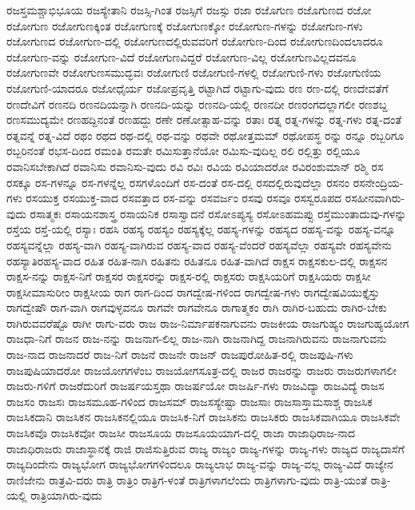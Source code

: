 {ರಜಸ್ತಮಶ್ಚಾಭಿಭೂಯ
ರಜಸ್ಯೇತಾನಿ
ರಜಸ್ಸಿ-ಗಿಂತ
ರಜಸ್ಸಿಗೆ
ರಜಸ್ಸು
ರಜಾ
ರಜೊಗುಣ
ರಜೊಗುಣದ
ರಜೋ
ರಜೋಗುಣ
ರಜೋಗುಣಕ್ಕಿಂತ
ರಜೋಗುಣಕ್ಕೆ
ರಜೋಗುಣಕ್ಕೋ
ರಜೋಗುಣ-ಗಳನ್ನು
ರಜೋಗುಣ-ಗಳು
ರಜೋಗುಣದ
ರಜೋಗುಣ-ದಲ್ಲಿ
ರಜೋಗುಣದಲ್ಲಿರುವವರಿಗೆ
ರಜೋಗುಣ-ದಿಂದ
ರಜೋಗುಣದಿಂದಲಾದರೂ
ರಜೋಗುಣ-ವನ್ನು
ರಜೋಗುಣ-ವಿದೆ
ರಜೋಗುಣವಿದ್ದರೆ
ರಜೋಗುಣ-ವಿಲ್ಲ
ರಜೋಗುಣವಿಲ್ಲದವನೂ
ರಜೋಗುಣವೇ
ರಜೋಗುಣಸಮುದ್ಭವಃ
ರಜೋಗುಣಿ
ರಜೋಗುಣಿ-ಗಳಲ್ಲಿ
ರಜೋಗುಣಿ-ಗಳು
ರಜೋಗುಣಿಯ
ರಜೋಗುಣಿ-ಯಾದರೂ
ರಜೋಧೈರ್ಯ
ರಜೋಪ್ರವೃತ್ತಿ
ರಟ್ಟಾಗಿದೆ
ರಟ್ಟಾಗು-ವುದು
ರಣ
ರಣ-ದಲ್ಲಿ
ರಣದೇವತೆಗೆ
ರಣದೇವಿಗೆ
ರಣನದಿ
ರಣನದಿಯನ್ನಾಗಿ
ರಣನದಿ-ಯನ್ನು
ರಣನದಿ-ಯಲ್ಲಿ
ರಣನದೀ
ರಣರಂಗದಲ್ಲಾಗಲೀ
ರಣಶಬ್ದ
ರಣಸಮುದ್ಯಮೇ
ರಣಹದ್ದಿನಂತೆ
ರಣಹದ್ದು
ರಣೇ
ರಣೋತ್ಸಾಹ-ವನ್ನು
ರತಾಃ
ರತ್ನ
ರತ್ನ-ಗಳನ್ನು
ರತ್ನ-ಗಳು
ರತ್ನ-ದಂತೆ
ರತ್ನವನ್ನೆ
ರತ್ನ-ವಿದೆ
ರಥಂ
ರಥದ
ರಥ-ದಲ್ಲಿ
ರಥ-ವನ್ನು
ರಥವೇ
ರಥೋತ್ತಮಮ್
ರಥೋಪಸ್ಥ
ರನ್ನು
ರನ್ನೂ
ರಬ್ಬರಿಗೂ
ರಬ್ಬರಿನಂತೆ
ರಭಸ-ದಿಂದ
ರಮಂತಿ
ರಮತೇ
ರಮಿಸುತ್ತಾನೆಯೋ
ರಮಿಸು-ವುದಿಲ್ಲ
ರಲಿ
ರಲ್ಲಿತ್ತು
ರಲ್ಲಿಯೂ
ರವಾನಿಸಬೇಕಾಗಿದೆ
ರವಾನಿಸು
ರವಾನಿಸು-ವುದು
ರವಿ
ರವಿಃ
ರವಿಯ
ರವಿಯಾದರೋ
ರವಿರಂಶುಮಾನ್
ರಶ್ಮಿ
ರಸ
ರಸಕ್ಕೂ
ರಸ-ಗಳನ್ನೂ
ರಸ-ಗಳನ್ನೆಲ್ಲ
ರಸಗಳೊಂದಿಗೆ
ರಸ-ದಂತೆ
ರಸ-ದಲ್ಲಿ
ರಸದಲ್ಲಿರುವುದೆಲ್ಲಾ
ರಸನಂ
ರಸನೇಂದ್ರಿಯ-ಗಳು
ರಸಯುಕ್ತ
ರಸಯುಕ್ತ-ವಾದ
ರಸವತ್ತಾದ
ರಸ-ವನ್ನು
ರಸವರ್ಜಂ
ರಸವು
ರಸವೂ
ರಸಸ್ವರೂಪದ
ರಸಹೀನವಾಗಿರು-ವುದು
ರಸಾತ್ಮಕಃ
ರಸಾಯನಶಾಸ್ತ್ರ
ರಸಾಯನಿಕ
ರಸಾಸ್ವಾದನೆ
ರಸೋಽಪ್ಯಸ್ಯ
ರಸೋಽಹಮಪ್ಸು
ರಸ್ತೆಮುಂತಾದುವು-ಗಳನ್ನು
ರಸ್ತೆಯ
ರಸ್ತೆ-ಯಲ್ಲಿ
ರಸ್ಯಾಃ
ರಹಸಿ
ರಹಸ್ಯ
ರಹಸ್ಯಂ
ರಹಸ್ಯಕ್ಕೆಲ್ಲ
ರಹಸ್ಯ-ಗಳನ್ನು
ರಹಸ್ಯದ
ರಹಸ್ಯ-ವನ್ನು
ರಹಸ್ಯ-ವನ್ನೂ
ರಹಸ್ಯವನ್ನೆಲ್ಲಾ
ರಹಸ್ಯ-ವಾಗಿ
ರಹಸ್ಯ-ವಾಗಿರುವ
ರಹಸ್ಯ-ವಾದ
ರಹಸ್ಯ-ವೆಂದರೆ
ರಹಸ್ಯವೆಲ್ಲಾ
ರಹಸ್ಯವೇ
ರಹಸ್ಯವೇನು
ರಹಸ್ಯಾತಿರಹಸ್ಯ-ವಾದ
ರಹಿತ
ರಹಿತ-ನಾಗಿ
ರಹಿತನು
ರಹಿತನೂ
ರಹಿತ-ವಾಗಿದೆ
ರಾಕ್ಷಸ
ರಾಕ್ಷಸಕುಲ-ದಲ್ಲಿ
ರಾಕ್ಷಸನ
ರಾಕ್ಷಸ-ನನ್ನು
ರಾಕ್ಷಸ-ನಿಗೆ
ರಾಕ್ಷಸರ
ರಾಕ್ಷಸರನ್ನು
ರಾಕ್ಷಸ-ರಲ್ಲಿ
ರಾಕ್ಷಸರು
ರಾಕ್ಷಸಿಯರಿಗೆ
ರಾಕ್ಷಸಿಯರು
ರಾಕ್ಷಸೀ
ರಾಕ್ಷಸೀಮಾಸುರೀಂ
ರಾಕ್ಷಸೀಯ
ರಾಗ
ರಾಗ-ದಿಂದ
ರಾಗದ್ವೇಷ-ಗಳಿಂದ
ರಾಗದ್ವೇಷ-ಗಳು
ರಾಗದ್ವೇಷವಿಯುಕ್ತೈಸ್ತು
ರಾಗದ್ವೇಷೌ
ರಾಗ-ವಾಗಿ
ರಾಗವುಳ್ಳವನೂ
ರಾಗವೇ
ರಾಗವೇನೂ
ರಾಗಾತ್ಮಕಂ
ರಾಗಿ
ರಾಗಿರ-ಬಹುದು
ರಾಗಿರ-ಬೇಕು
ರಾಗಿರುವವರೆಷ್ಟೊ
ರಾಗೀ
ರಾಗು-ವರು
ರಾಜ
ರಾಜ-ನಿರ್ಮಾಪಕನಾಗುವನು
ರಾಜಕೀಯ
ರಾಜಗುಹ್ಯಂ
ರಾಜಗುಹ್ಯಯೋಗ
ರಾಜಧಾ-ನಿಗೆ
ರಾಜನ
ರಾಜ-ನನ್ನು
ರಾಜನಾಗ-ಲಿಲ್ಲ
ರಾಜ-ನಾಗಿ
ರಾಜನಾಗಿದ್ದ
ರಾಜನಾಗಿರುವನು
ರಾಜನಾಗುವನು
ರಾಜ-ನಾದ
ರಾಜನಾದರೆ
ರಾಜ-ನಿಗೆ
ರಾಜನೆ
ರಾಜನೇ
ರಾಜನ್
ರಾಜಪುರೋಹಿತ-ರಲ್ಲಿ
ರಾಜಪುಷಿ-ಗಳು
ರಾಜಪುಷಿಯಾದರೋ
ರಾಜಯೋಗಗಳೆಂಬ
ರಾಜಯೋಗಸೂತ್ರ-ದಲ್ಲಿ
ರಾಜರ
ರಾಜರನ್ನು
ರಾಜರು
ರಾಜರುಗಳಾಗಲೀ
ರಾಜರು-ಗಳಿಗೆ
ರಾಜರೆದುರಿಗೆ
ರಾಜರ್ಷಯಸ್ತಥಾ
ರಾಜರ್ಷಯೋ
ರಾಜರ್ಷಿ-ಗಳು
ರಾಜವಿದ್ಯಾ
ರಾಜವಿದ್ಯೆ
ರಾಜಸ
ರಾಜಸಂ
ರಾಜಸಃ
ರಾಜಸಮೂಹ-ಗಳಿಂದ
ರಾಜಸಮ್
ರಾಜಸಸ್ಯೇಷ್ಟಾ
ರಾಜಸಾಃ
ರಾಜಸಾಸ್ತಾಮಸಾಶ್ಚ
ರಾಜಸಿಕ
ರಾಜಸಿಕದಾನಿ
ರಾಜಸಿಕನ
ರಾಜಸಿಕನಲ್ಲಿಯೂ
ರಾಜಸಿಕ-ನಿಗೆ
ರಾಜಸಿಕನು
ರಾಜಸಿಕರು
ರಾಜಸಿಕವಾಗಿಯೂ
ರಾಜಸಿಕವೇ
ರಾಜಸಿಕವೊ
ರಾಜಸಿಕವೋ
ರಾಜಸೀ
ರಾಜಸೂಯ
ರಾಜಸೂಯಯಾಗ-ದಲ್ಲಿ
ರಾಜಾ
ರಾಜಾಧಿರಾಜ-ನಾದ
ರಾಜಾಧಿರಾಜರು
ರಾಜಾಸ್ಥಾನಕ್ಕೆ
ರಾಜಿ
ರಾಜಿಸುತ್ತಿರುವ
ರಾಜ್ಯ
ರಾಜ್ಯಂ
ರಾಜ್ಯ-ಗಳನ್ನು
ರಾಜ್ಯ-ಗಳು
ರಾಜ್ಯದ
ರಾಜ್ಯದಾಸೆಗೆ
ರಾಜ್ಯದಿಂದೇನು
ರಾಜ್ಯಭೋಗ
ರಾಜ್ಯಭೋಗಗಳಿಂದಲೂ
ರಾಜ್ಯಲಾಭ
ರಾಜ್ಯ-ವನ್ನು
ರಾಜ್ಯ-ವಲ್ಲ
ರಾಜ್ಯ-ವಿದೆ
ರಾಜ್ಯೇನ
ರಾಣಿಜೇನು
ರಾತ್ರವಿ-ದರು
ರಾತ್ರಿ
ರಾತ್ರಿಂ
ರಾತ್ರಿಗ-ಳಂತೆ
ರಾತ್ರಿಗಳಾಗಲೆಂದು
ರಾತ್ರಿಗಳಾಗು-ವುದು
ರಾತ್ರಿ-ಯಂತೆ
ರಾತ್ರಿ-ಯಲ್ಲಿ
ರಾತ್ರಿಯಾಗಿರು-ವುದು
}
